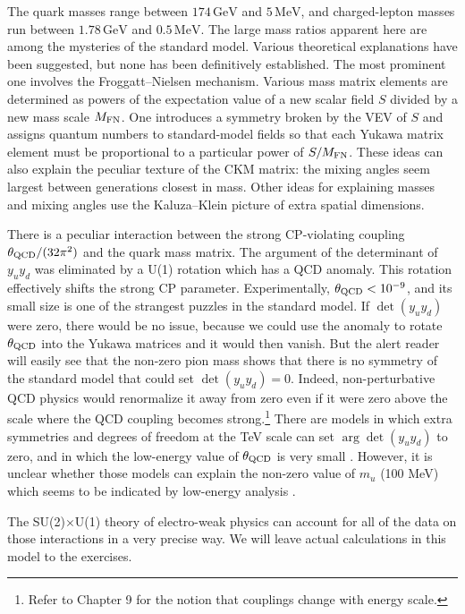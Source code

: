 The quark masses range between $174\,\mathrm{GeV}$ and $5\,\mathrm{MeV}$, and
charged-lepton masses run between $1.78\,\mathrm{GeV}$ and $0.5\,\mathrm{MeV}$.
The large mass ratios apparent here are among the mysteries of the standard
model. Various theoretical explanations have been suggested, but none has
been definitively established. The most prominent one involves the
Froggatt--Nielsen \cite{banks-ref-96} mechanism. Various mass matrix elements
are determined as powers of the expectation value of a new scalar field $S$
divided by a new mass scale $M_{\rm FN}$. One introduces a symmetry broken by
the VEV of $S$ and assigns quantum numbers to standard-model fields so that
each Yukawa matrix element must be proportional to a particular power of
$S/M_{\rm FN}$. These ideas can also explain the peculiar texture of the CKM
matrix: the mixing angles seem largest between generations closest in mass.
Other ideas for explaining masses and mixing angles use the Kaluza--Klein
picture of extra spatial dimensions.

There is a peculiar interaction between the strong CP-violating coupling
$\theta_{\rm QCD}/(32\pi^2)$ and the quark mass matrix. The argument of the
determinant of $y_u y_d$ was eliminated by a U(1) rotation which has a QCD
anomaly. This rotation effectively shifts the strong CP parameter.
Experimentally, $\theta_{\rm QCD}<10^{-9}$, and its small size is one of the
strangest puzzles in the standard model. If $\det(y_u y_d)$ were zero, there
would be no issue, because we could use the anomaly to rotate
$\theta_{\rm QCD}$ into the Yukawa matrices and it would then vanish. But the
alert reader will easily see that the non-zero pion mass shows that there is no
symmetry of the standard model that could set $\det(y_u y_d)=0$. Indeed,
non-perturbative QCD physics would renormalize it away from zero even if it
were zero above the scale where the QCD coupling becomes strong.\footnote[12]{Refer
to Chapter 9 for the notion that couplings change with energy scale.} There are
models in which extra symmetries and degrees of freedom at the TeV scale can
set $\arg\det(y_u y_d)$ to zero, and in which the low-energy value of
$\theta_{\rm QCD}$ is very small \cite{banks-ref-97}. However, it is unclear
whether those models can explain the non-zero value of $m_u$ (100 MeV) which
seems to be indicated by low-energy analysis \cite{banks-ref-98}.


The SU(2)$\times$U(1) theory of electro-weak physics can account for all of the
data on those interactions in a very precise way. 
We will leave actual calculations in this model to the exercises.

